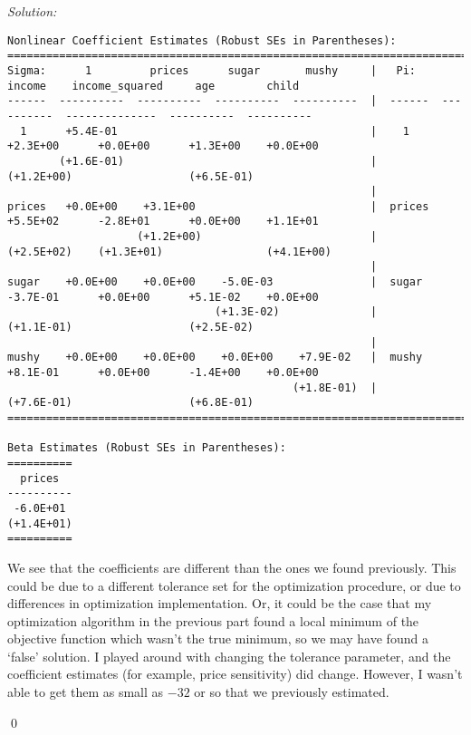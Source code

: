 \documentclass[12pt]{article}
\newenvironment{sol}
    {\emph{Solution:}
    }
    {
    \qed
    }
\begin{document}
\begin{sol}
\begin{lstlisting}
Nonlinear Coefficient Estimates (Robust SEs in Parentheses):
=====================================================================================================================
Sigma:      1         prices      sugar       mushy     |   Pi:      income    income_squared     age        child   
------  ----------  ----------  ----------  ----------  |  ------  ----------  --------------  ----------  ----------
  1      +5.4E-01                                       |    1      +2.3E+00      +0.0E+00      +1.3E+00    +0.0E+00 
        (+1.6E-01)                                      |          (+1.2E+00)                  (+6.5E-01)            
                                                        |                                                            
prices   +0.0E+00    +3.1E+00                           |  prices   +5.5E+02      -2.8E+01      +0.0E+00    +1.1E+01 
                    (+1.2E+00)                          |          (+2.5E+02)    (+1.3E+01)                (+4.1E+00)
                                                        |                                                            
sugar    +0.0E+00    +0.0E+00    -5.0E-03               |  sugar    -3.7E-01      +0.0E+00      +5.1E-02    +0.0E+00 
                                (+1.3E-02)              |          (+1.1E-01)                  (+2.5E-02)            
                                                        |                                                            
mushy    +0.0E+00    +0.0E+00    +0.0E+00    +7.9E-02   |  mushy    +8.1E-01      +0.0E+00      -1.4E+00    +0.0E+00 
                                            (+1.8E-01)  |          (+7.6E-01)                  (+6.8E-01)            
=====================================================================================================================

Beta Estimates (Robust SEs in Parentheses):
==========
  prices  
----------
 -6.0E+01 
(+1.4E+01)
==========
\end{lstlisting}
We see that the coefficients are different than the ones we found previously. This could be due to a different tolerance set for the optimization procedure, or due to differences in optimization implementation. Or, it could be the case that my optimization algorithm in the previous part found a local minimum of the objective function which wasn't the true minimum, so we may have found a `false' solution. I played around with changing the tolerance parameter, and the coefficient estimates (for example, price sensitivity) did change. However, I wasn't able to get them as small as $-32$ or so that we previously estimated. 


\end{sol}
\end{document}
